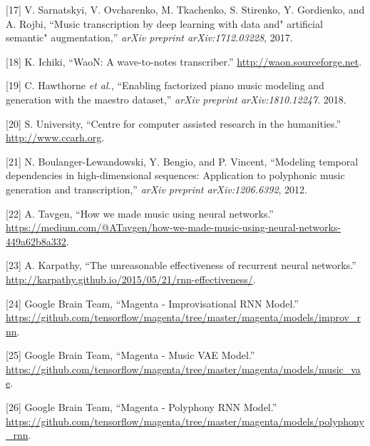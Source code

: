 \documentclass[12pt,]{article}
\begin{document}
\leavevmode\hypertarget{ref-sarnatskyi2017music}{}%
{[}17{]} V. Sarnatskyi, V. Ovcharenko, M. Tkachenko, S. Stirenko, Y.
Gordienko, and A. Rojbi, ``Music transcription by deep learning with
data and" artificial semantic" augmentation,'' \emph{arXiv preprint
arXiv:1712.03228}, 2017.

\leavevmode\hypertarget{ref-waon}{}%
{[}18{]} K. Ichiki, ``WaoN: A wave-to-notes transcriber.''
\url{http://waon.sourceforge.net}.

\leavevmode\hypertarget{ref-maestro2018}{}%
{[}19{]} C. Hawthorne \emph{et al.}, ``Enabling factorized piano music
modeling and generation with the maestro dataset,'' \emph{arXiv preprint
arXiv:1810.12247}. 2018.

\leavevmode\hypertarget{ref-ccarh}{}%
{[}20{]} S. University, ``Centre for computer assisted research in the
humanities.'' \\
\url{http://www.ccarh.org}.

\leavevmode\hypertarget{ref-boulanger2012modeling}{}%
{[}21{]} N. Boulanger-Lewandowski, Y. Bengio, and P. Vincent, ``Modeling
temporal dependencies in high-dimensional sequences: Application to
polyphonic music generation and transcription,'' \emph{arXiv preprint
arXiv:1206.6392}, 2012.

\leavevmode\hypertarget{ref-alextavgen}{}%
{[}22{]} A. Tavgen, ``How we made music using neural networks.'' \\
\url{https://medium.com/@ATavgen/how-we-made-music-using-neural-networks-449a62b8a332}.

\leavevmode\hypertarget{ref-karpathy}{}%
{[}23{]} A. Karpathy, ``The unreasonable effectiveness of recurrent
neural networks.'' \\
\url{http://karpathy.github.io/2015/05/21/rnn-effectiveness/}.

\leavevmode\hypertarget{ref-magentaimprov}{}%
{[}24{]} \relax Google Brain Team, ``Magenta - Improvisational RNN
Model.'' \\
\url{https://github.com/tensorflow/magenta/tree/master/magenta/models/improv_rnn}.

\leavevmode\hypertarget{ref-magentavae}{}%
{[}25{]} \relax Google Brain Team, ``Magenta - Music VAE Model.'' \\
\url{https://github.com/tensorflow/magenta/tree/master/magenta/models/music_vae}.

\leavevmode\hypertarget{ref-magentapolyphony}{}%
{[}26{]} \relax Google Brain Team, ``Magenta - Polyphony RNN Model.'' \\
\url{https://github.com/tensorflow/magenta/tree/master/magenta/models/polyphony_rnn}.
\end{document}
